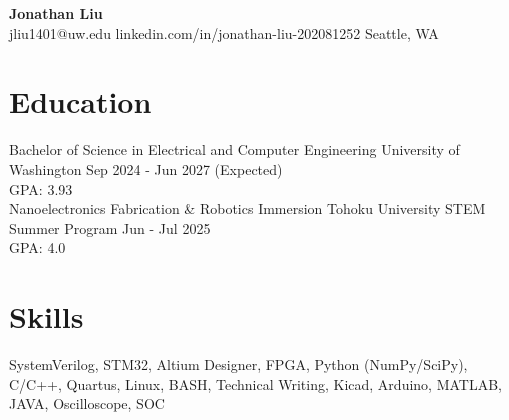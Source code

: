 \documentclass[11pt,letterpaper]{article}
\begin{document}
\begin{center}
{\LARGE \textbf{Jonathan Liu}}\\[2pt]
\small jliu1401@uw.edu \textbullet{} linkedin.com/in/jonathan-liu-202081252 \textbullet{} Seattle, WA
\end{center}
\section*{Education}
\noindent Bachelor of Science in Electrical and Computer Engineering \textbar{} University of Washington \textbar{} Sep 2024 - Jun 2027 (Expected)\\
GPA: 3.93\\
\noindent Nanoelectronics Fabrication \& Robotics Immersion \textbar{} Tohoku University STEM Summer Program \textbar{} Jun - Jul 2025\\
GPA: 4.0\\
\section*{Skills}
SystemVerilog, STM32, Altium Designer, FPGA, Python (NumPy/SciPy), C/C++, Quartus, Linux, BASH, Technical Writing, Kicad, Arduino, MATLAB, JAVA, Oscilloscope, SOC
\end{document}
